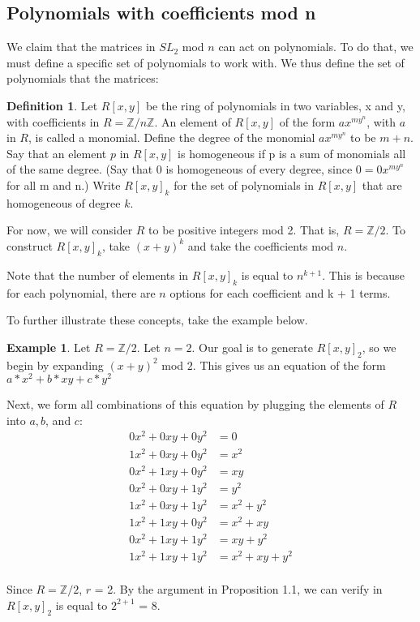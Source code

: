 \documentclass[a4paper,draft]{amsproc}
\theoremstyle{plain}
\theoremstyle{definition}
\newtheorem{exm}{Example}[section]
\newtheorem{dfn}{Definition}[section]
\theoremstyle{remark}
\numberwithin{equation}{section}
\begin{document}
\subsection{Polynomials with coefficients mod n}
We claim that the matrices in $SL_{2}$ mod $n$ can act on polynomials. To do that, we must define a specific set of polynomials to work with. 
We thus define the set of polynomials that the matrices: 
\begin{dfn}
Let $R[x,y]$ be the ring of polynomials in two variables, x and y, with coefficients in $R = \mathbb{Z}/n\mathbb{Z}$. An element of $R[x,y]$ of the form  $ax^{my^{n}}$, with $a$ in $R$, is called a monomial. Define the degree of the monomial $ax^{my^{n}}$ to be $m+n$. Say that an element $p$ in $R[x,y]$ is homogeneous if p is a sum of monomials all of the same degree. (Say that 0 is homogeneous of every degree, since $0=0x^{my^{n}}$ for all m and n.) Write $R[x,y]_{k}$ for the set of polynomials in $R[x,y]$ that are homogeneous of degree $k$.
\end{dfn}
For now, we will consider $R$ to be positive integers mod 2. That is, $R = \mathbb{Z}/2$. To construct $R[x,y]_{k}$, take $(x+y)^{k}$ and take the coefficients mod $n$.

Note that the number of elements in $R[x,y]_{k}$ is equal to $n^{k + 1}$. This is because for each polynomial, there are $n$ options for each coefficient and k + 1 terms.
 
To further illustrate these concepts, take the example below. 
\begin{exm}
Let $R = \mathbb{Z}/2$.  Let $n = 2$. Our goal is to generate $R[x,y]_{2}$, so we begin by expanding $(x + y)^{2}$ mod $2$. 
This gives us an equation of the form $a*x^{2} + b*xy + c*y^{2} $

Next, we form all combinations of this equation by plugging the elements of $R$ into $a, b$, and $c$: 
\begin{align*}
0x^{2} + 0xy + 0y^{2} &= 0 \\
1x^{2} + 0xy + 0y^{2} &= x^{2} \\
0x^{2} +1xy + 0y^{2}  &= xy \\
0x^{2} + 0xy + 1y^{2} &= y^{2} \\
1x^{2} + 0xy + 1y^{2} &= x^{2} + y^{2} \\
1x^{2} + 1xy + 0y^{2} &= x^{2} + xy \\
0x^{2} + 1xy + 1y^{2} &= xy + y^{2} \\
1x^{2} + 1xy + 1y^{2}  &= x^{2} + xy + y^{2}\\
\end{align*}

Since  $R = \mathbb{Z}/2$, $r$ = 2. By the argument in Proposition 1.1, we can verify  in $R[x,y]_{2}$ is equal to $2^{2 + 1}$ = 8.
\end{exm}
\end{document}
